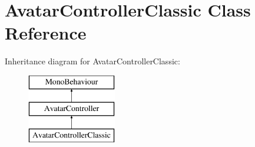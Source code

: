\hypertarget{class_avatar_controller_classic}{}\section{Avatar\+Controller\+Classic Class Reference}
\label{class_avatar_controller_classic}
Inheritance diagram for Avatar\+Controller\+Classic\+:\begin{figure}[H]
\begin{center}
\leavevmode
\includegraphics[height=3.000000cm]{class_avatar_controller_classic}
\end{center}
\end{figure}
